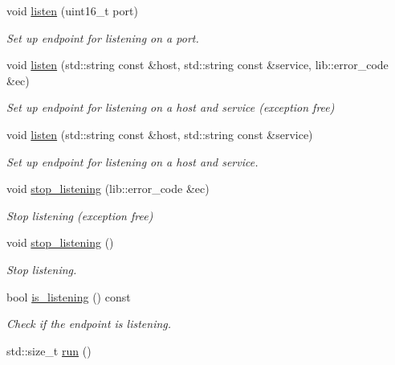 \begin{DoxyCompactItemize}
void \hyperlink{classwebsocketpp_1_1transport_1_1asio_1_1endpoint_a80c1e2bb6edbfbfc46d387015e528117}{listen} (uint16\+\_\+t port)
\begin{DoxyCompactList}\small\item\em Set up endpoint for listening on a port. \end{DoxyCompactList}\item 
void \hyperlink{classwebsocketpp_1_1transport_1_1asio_1_1endpoint_a85606665cc9c948194076c2377cb61c0}{listen} (std\+::string const \&host, std\+::string const \&service, lib\+::error\+\_\+code \&ec)
\begin{DoxyCompactList}\small\item\em Set up endpoint for listening on a host and service (exception free) \end{DoxyCompactList}\item 
void \hyperlink{classwebsocketpp_1_1transport_1_1asio_1_1endpoint_ad69ca2f648f48c7616ad1df614d88d67}{listen} (std\+::string const \&host, std\+::string const \&service)
\begin{DoxyCompactList}\small\item\em Set up endpoint for listening on a host and service. \end{DoxyCompactList}\item 
void \hyperlink{classwebsocketpp_1_1transport_1_1asio_1_1endpoint_a0da87d3a3e8ee8279fe59eb0385d81e3}{stop\+\_\+listening} (lib\+::error\+\_\+code \&ec)
\begin{DoxyCompactList}\small\item\em Stop listening (exception free) \end{DoxyCompactList}\item 
void \hyperlink{classwebsocketpp_1_1transport_1_1asio_1_1endpoint_af4ae00e12a34475a1950d69f5b9da507}{stop\+\_\+listening} ()
\begin{DoxyCompactList}\small\item\em Stop listening. \end{DoxyCompactList}\item 
bool \hyperlink{classwebsocketpp_1_1transport_1_1asio_1_1endpoint_af33506cbd90a184cdf1a0424ec2d0619}{is\+\_\+listening} () const
\begin{DoxyCompactList}\small\item\em Check if the endpoint is listening. \end{DoxyCompactList}\item 
std\+::size\+\_\+t \hyperlink{classwebsocketpp_1_1transport_1_1asio_1_1endpoint_a5c457ea6734a1d8aafe6c6f364996dfe}{run} ()\hypertarget{classwebsocketpp_1_1transport_1_1asio_1_1endpoint_a5c457ea6734a1d8aafe6c6f364996dfe}{}\label{classwebsocketpp_1_1transport_1_1asio_1_1endpoint_a5c457ea6734a1d8aafe6c6f364996dfe}


\end{DoxyCompactItemize}
